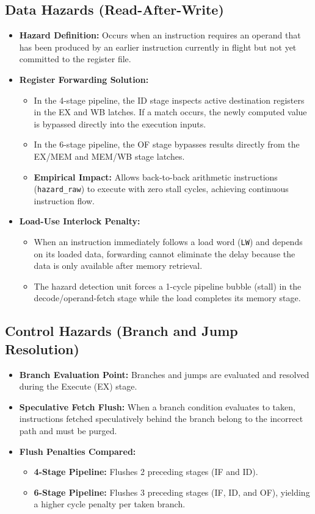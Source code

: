 \documentclass[11pt,a4paper]{article}
\begin{document}
\subsection{Data Hazards (Read-After-Write)}
\begin{itemize}
    \item \textbf{Hazard Definition:} Occurs when an instruction requires an operand that has been produced by an earlier instruction currently in flight but not yet committed to the register file.
    \item \textbf{Register Forwarding Solution:}
    \begin{itemize}
        \item In the 4-stage pipeline, the ID stage inspects active destination registers in the EX and WB latches. If a match occurs, the newly computed value is bypassed directly into the execution inputs.
        \item In the 6-stage pipeline, the OF stage bypasses results directly from the EX/MEM and MEM/WB stage latches.
        \item \textbf{Empirical Impact:} Allows back-to-back arithmetic instructions (\texttt{hazard\_raw}) to execute with zero stall cycles, achieving continuous instruction flow.
    \end{itemize}
    \item \textbf{Load-Use Interlock Penalty:}
    \begin{itemize}
        \item When an instruction immediately follows a load word (\texttt{LW}) and depends on its loaded data, forwarding cannot eliminate the delay because the data is only available after memory retrieval.
        \item The hazard detection unit forces a 1-cycle pipeline bubble (stall) in the decode/operand-fetch stage while the load completes its memory stage.
    \end{itemize}
\end{itemize}

\subsection{Control Hazards (Branch and Jump Resolution)}
\begin{itemize}
    \item \textbf{Branch Evaluation Point:} Branches and jumps are evaluated and resolved during the Execute (EX) stage.
    \item \textbf{Speculative Fetch Flush:} When a branch condition evaluates to taken, instructions fetched speculatively behind the branch belong to the incorrect path and must be purged.
    \item \textbf{Flush Penalties Compared:}
    \begin{itemize}
        \item \textbf{4-Stage Pipeline:} Flushes 2 preceding stages (IF and ID).
        \item \textbf{6-Stage Pipeline:} Flushes 3 preceding stages (IF, ID, and OF), yielding a higher cycle penalty per taken branch.
    \end{itemize}
\end{itemize}
\end{document}
